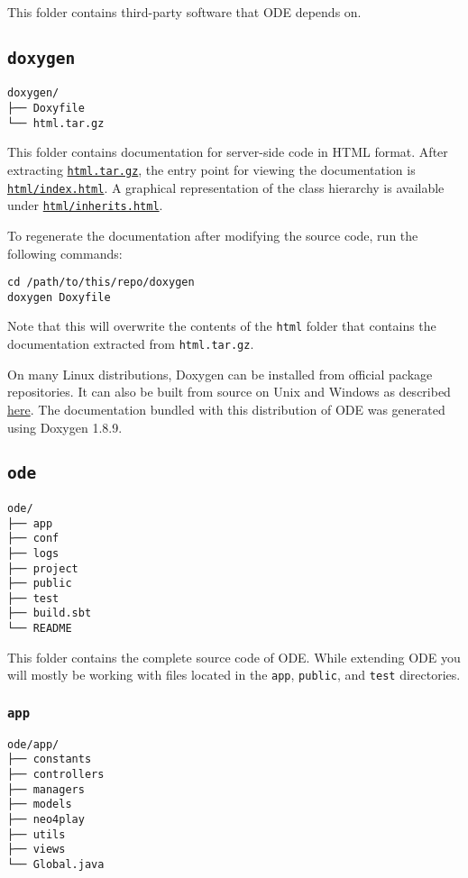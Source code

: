 \documentclass[11pt]{article}
\begin{document}
This folder contains third-party software that ODE depends on.

\subsection{\texttt{doxygen}}
\label{sec-3-2}
\begin{verbatim}
doxygen/
├── Doxyfile
└── html.tar.gz
\end{verbatim}

This folder contains documentation for server-side code in HTML
format. After extracting \href{doxygen/html.tar.gz}{\texttt{html.tar.gz}}, the entry point for viewing
the documentation is \href{doxygen/html/index.html}{\texttt{html/index.html}}. A graphical representation
of the class hierarchy is available under \href{doxygen/html/inherits.html}{\texttt{html/inherits.html}}.

To regenerate the documentation after modifying the source code,
run the following commands:

\begin{verbatim}
cd /path/to/this/repo/doxygen
doxygen Doxyfile
\end{verbatim}

Note that this will overwrite the contents of the \texttt{html} folder
that contains the documentation extracted from \texttt{html.tar.gz}.

On many Linux distributions, Doxygen can be installed from
official package repositories. It can also be built from source on
Unix and Windows as described \href{http://www.stack.nl/~dimitri/doxygen/manual/install.html}{here}. The documentation bundled with
this distribution of ODE was generated using Doxygen 1.8.9.

\subsection{\texttt{ode}}
\label{sec-3-3}
\begin{verbatim}
ode/
├── app
├── conf
├── logs
├── project
├── public
├── test
├── build.sbt
└── README
\end{verbatim}

This folder contains the complete source code of ODE. While
extending ODE you will mostly be working with files located in the
\texttt{app}, \texttt{public}, and \texttt{test} directories.

\subsubsection{\texttt{app}}
\label{sec-3-3-1}
\begin{verbatim}
ode/app/
├── constants
├── controllers
├── managers
├── models
├── neo4play
├── utils
├── views
└── Global.java
\end{verbatim}
\end{document}
